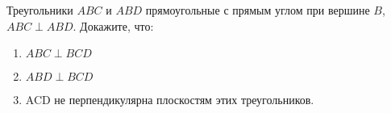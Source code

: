 Треугольники $ABC$ и $ABD$ прямоугольные с прямым углом при вершине $B$, $ABC\perp ABD$. Докажите, что:

\begin{enumerate}

\item $ABC\perp BCD$
\item $ABD\perp BCD$
\item ACD не перпендикулярна плоскостям этих треугольников.

\end{enumerate}